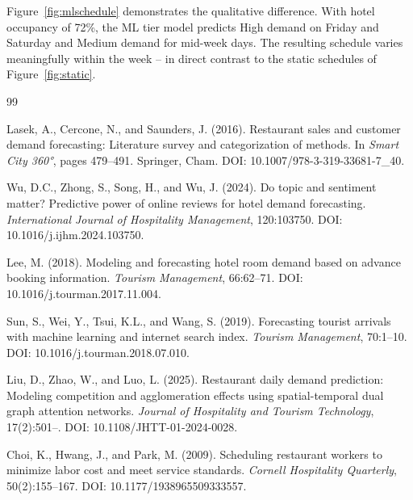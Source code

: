 \documentclass[12pt,a4paper,oneside]{article}
\begin{document}
Figure~\ref{fig:mlschedule} demonstrates the qualitative difference. With hotel occupancy of 72\%, the ML tier model predicts High demand on Friday and Saturday and Medium demand for mid-week days. The resulting schedule varies meaningfully within the week -- in direct contrast to the static schedules of Figure~\ref{fig:static}.


\begin{thebibliography}{99}

Lasek, A., Cercone, N., and Saunders, J. (2016).
\newblock Restaurant sales and customer demand forecasting: Literature survey and categorization of methods.
\newblock In \textit{Smart City 360°}, pages 479--491. Springer, Cham.
\newblock DOI: 10.1007/978-3-319-33681-7\_40.

Wu, D.C., Zhong, S., Song, H., and Wu, J. (2024).
\newblock Do topic and sentiment matter? Predictive power of online reviews for hotel demand forecasting.
\newblock \textit{International Journal of Hospitality Management}, 120:103750.
\newblock DOI: 10.1016/j.ijhm.2024.103750.

Lee, M. (2018).
\newblock Modeling and forecasting hotel room demand based on advance booking information.
\newblock \textit{Tourism Management}, 66:62--71.
\newblock DOI: 10.1016/j.tourman.2017.11.004.

Sun, S., Wei, Y., Tsui, K.L., and Wang, S. (2019).
\newblock Forecasting tourist arrivals with machine learning and internet search index.
\newblock \textit{Tourism Management}, 70:1--10.
\newblock DOI: 10.1016/j.tourman.2018.07.010.

Liu, D., Zhao, W., and Luo, L. (2025).
\newblock Restaurant daily demand prediction: Modeling competition and agglomeration effects using spatial-temporal dual graph attention networks.
\newblock \textit{Journal of Hospitality and Tourism Technology}, 17(2):501--.
\newblock DOI: 10.1108/JHTT-01-2024-0028.

Choi, K., Hwang, J., and Park, M. (2009).
\newblock Scheduling restaurant workers to minimize labor cost and meet service standards.
\newblock \textit{Cornell Hospitality Quarterly}, 50(2):155--167.
\newblock DOI: 10.1177/1938965509333557.


\end{thebibliography}
\end{document}
